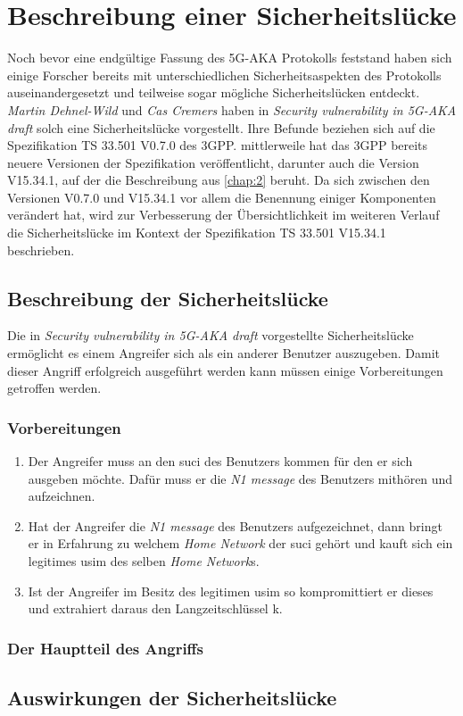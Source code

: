 \chapter{Beschreibung einer Sicherheitsl\"ucke}
\label{chap:4}

Noch bevor eine endgültige Fassung des 5G-AKA Protokolls feststand haben sich einige Forscher bereits mit unterschiedlichen Sicherheitsaspekten des Protokolls auseinandergesetzt und teilweise sogar mögliche Sicherheitslücken entdeckt.
\textit{Martin Dehnel-Wild} und \textit{Cas Cremers} haben in \textit{Security vulnerability in 5G-AKA draft} solch eine Sicherheitslücke vorgestellt. %
Ihre Befunde beziehen sich auf die Spezifikation TS 33.501 V0.7.0 des 3GPP. %
mittlerweile hat das 3GPP bereits neuere Versionen der Spezifikation veröffentlicht, darunter auch die Version V15.34.1, auf der die Beschreibung aus \cref{chap:2} beruht. %
Da sich zwischen den Versionen V0.7.0 und V15.34.1 vor allem die Benennung einiger Komponenten verändert hat, wird zur Verbesserung der Übersichtlichkeit im weiteren Verlauf die Sicherheitslücke im Kontext der Spezifikation TS 33.501 V15.34.1 beschrieben.


\section{Beschreibung der Sicherheitslücke}

Die in \textit{Security vulnerability in 5G-AKA draft} vorgestellte Sicherheitslücke ermöglicht es einem Angreifer sich als ein anderer Benutzer auszugeben. %
Damit dieser Angriff erfolgreich ausgeführt werden kann müssen einige Vorbereitungen getroffen werden.

\subsection{Vorbereitungen}

\begin{enumerate}
\item Der Angreifer muss an den \gls{suci} des Benutzers kommen für den er sich ausgeben möchte.
Dafür muss er die \textit{N1 message} des Benutzers mithören und aufzeichnen.

\item Hat der Angreifer die \textit{N1 message} des Benutzers aufgezeichnet, dann bringt er in Erfahrung zu welchem \textit{Home Network} der \gls{suci} gehört und kauft sich ein legitimes \gls{usim} des selben \textit{Home Network}s.

\item Ist der Angreifer im Besitz des legitimen \gls{usim} so kompromittiert er dieses und extrahiert daraus den Langzeitschlüssel \gls{k}.

\end{enumerate}

\subsection{Der Hauptteil des Angriffs}




\section{Auswirkungen der Sicherheitslücke}
